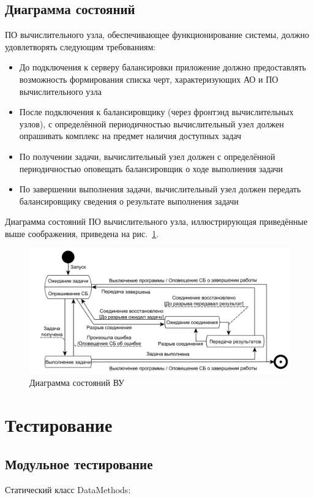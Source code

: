 \documentclass[a4paper,12pt]{report}
\numberwithin{equation}{section}
\begin{document}
\subsection{Диаграмма состояний}
ПО вычислительного узла, обеспечивающее функционирование системы, должно удовлетворять следующим требованиям:
\begin{itemize}
  \item До подключения к серверу балансировки приложение должно предоставлять возможность формирования списка черт, характеризующих АО и ПО вычислительного узла
  \item После подключения к балансировщику (через фронтэнд вычислительных узлов), с определённой периодичностью вычислительный узел должен опрашивать комплекс на предмет наличия доступных задач
  \item По получении задачи, вычислительный узел должен с определённой периодичностью оповещать балансировщик о ходе выполнения задачи
  \item По завершении выполнения задачи, вычислительный узел должен передать балансировщику сведения о результате выполнения задачи
\end{itemize}

Диаграмма состояний ПО вычислительного узла, иллюстрирующая приведённые выше соображения, приведена на рис.~\ref{fig:node-state}.

\begin{figure}
  \centering
  \includegraphics[width=\linewidth]{../diagrams/compnode/state}
  \caption{Диаграмма состояний ВУ}
  \label{fig:node-state}
\end{figure}

\section{Тестирование}
\subsection{Модульное тестирование}
Статический класс DataMethods:
\end{document}
